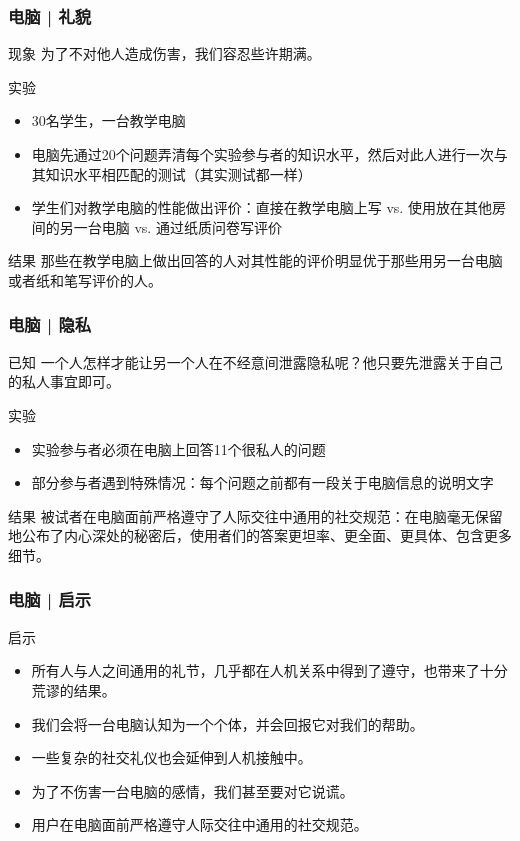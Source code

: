 \begin{frame}
  \frametitle{电脑 | 礼貌}
  \begin{block}{现象}
    为了不对他人造成伤害，我们容忍些许期满。
  \end{block}
  \pause
  \begin{block}{实验}
    \begin{itemize}
      \item 30名学生，一台教学电脑
      \item 电脑先通过20个问题弄清每个实验参与者的知识水平，然后对此人进行一次与其知识水平相匹配的测试（其实测试都一样）
      \item 学生们对教学电脑的性能做出评价：直接在教学电脑上写 vs. 使用放在其他房间的另一台电脑 vs. 通过纸质问卷写评价
    \end{itemize}
  \end{block}
  \pause
  \begin{block}{结果}
    那些在教学电脑上做出回答的人对其性能的评价明显优于那些用另一台电脑或者纸和笔写评价的人。
  \end{block}
\end{frame}

\begin{frame}
  \frametitle{电脑 | 隐私}
  \begin{block}{已知}
    一个人怎样才能让另一个人在不经意间泄露隐私呢？他只要先泄露关于自己的私人事宜即可。
  \end{block}
  \pause
  \begin{block}{实验}
    \begin{itemize}
      \item 实验参与者必须在电脑上回答11个很私人的问题
      \item 部分参与者遇到特殊情况：每个问题之前都有一段关于电脑信息的说明文字
    \end{itemize}
  \end{block}
  \pause
  \begin{block}{结果}
    被试者在电脑面前严格遵守了人际交往中通用的社交规范：在电脑毫无保留地公布了内心深处的秘密后，使用者们的答案更坦率、更全面、更具体、包含更多细节。
  \end{block}
\end{frame}

\begin{frame}
  \frametitle{电脑 | 启示}
  \begin{block}{启示}
    \begin{itemize}
      \item 所有人与人之间通用的礼节，几乎都在人机关系中得到了遵守，也带来了十分荒谬的结果。
      \item 我们会将一台电脑认知为一个个体，并会回报它对我们的帮助。
      \item 一些复杂的社交礼仪也会延伸到人机接触中。
      \item 为了不伤害一台电脑的感情，我们甚至要对它说谎。
      \item 用户在电脑面前严格遵守人际交往中通用的社交规范。
    \end{itemize}
  \end{block}
\end{frame}


